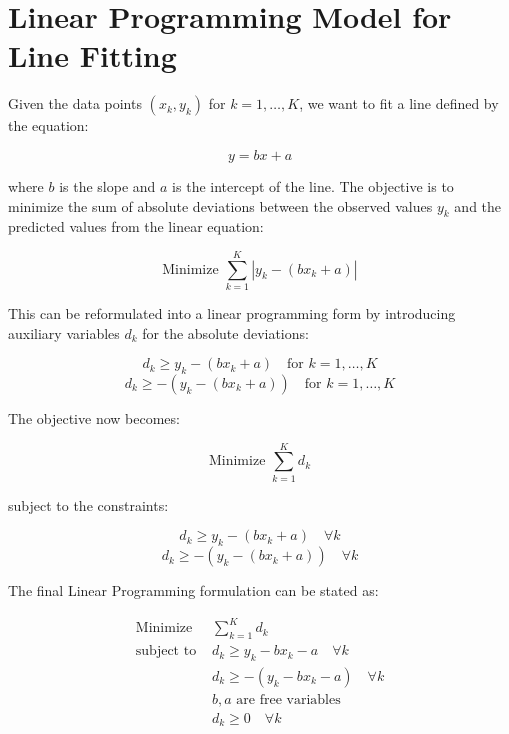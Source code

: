 \documentclass{article}
\begin{document}
\section*{Linear Programming Model for Line Fitting}

Given the data points $(x_k, y_k)$ for \( k = 1, \ldots, K \), we want to fit a line defined by the equation: 

\[
y = bx + a
\]

where \( b \) is the slope and \( a \) is the intercept of the line. The objective is to minimize the sum of absolute deviations between the observed values \( y_k \) and the predicted values from the linear equation:

\[
\text{Minimize } \sum_{k=1}^{K} |y_k - (bx_k + a)|
\]

This can be reformulated into a linear programming form by introducing auxiliary variables \( d_k \) for the absolute deviations:

\[
d_k \geq y_k - (bx_k + a) \quad \text{for } k = 1, \ldots, K
\]
\[
d_k \geq -(y_k - (bx_k + a)) \quad \text{for } k = 1, \ldots, K
\]

The objective now becomes:

\[
\text{Minimize } \sum_{k=1}^{K} d_k
\]

subject to the constraints:

\[
d_k \geq y_k - (bx_k + a) \quad \forall k
\]
\[
d_k \geq -(y_k - (bx_k + a)) \quad \forall k
\]

The final Linear Programming formulation can be stated as:

\begin{align*}
\text{Minimize } & \sum_{k=1}^{K} d_k \\
\text{subject to } & d_k \geq y_k - bx_k - a \quad \forall k \\
                   & d_k \geq -(y_k - bx_k - a) \quad \forall k \\
                   & b, a \text{ are free variables} \\
                   & d_k \geq 0 \quad \forall k
\end{align*}
\end{document}
